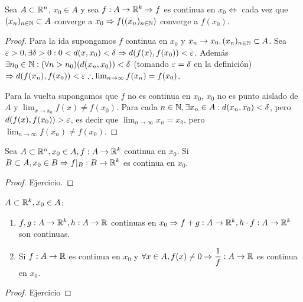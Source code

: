 \begin{prop}
  Sea \(A \subset \mathbb{R}^n\), \(x_0 \in A\) y sea \(f: A \to \mathbb{R}^k \Rightarrow f\) es continua en \(x_0 \iff\) cada vez que \((x_n)_{n \in \mathbb{N}} \subset A\) converge a \(x_0 \Rightarrow f((x_n)_{n \in \mathbb{N}})\) converge a \(f(x_0)\).
  \begin{proof}
    Para la ida supongamos \(f\) continua en \(x_0\) y \(x_n \to x_0, (x_n)_{n \in \mathbb{N}} \subset A\). Sea \(\varepsilon > 0, \exists \delta > 0 : 0 < d(x, x_0) < \delta \Rightarrow d(f(x), f(x_0)) < \varepsilon\).
    Además \(\exists n_0 \in \mathbb{N} : (\forall n > n_0)(d(x_n, x_0)) < \delta\) (tomando \(\varepsilon = \delta\) en la definición) \(\Rightarrow d(f(x_n), f(x_0)) < \varepsilon \therefore \lim_{n \to \infty} f(x_n) = f(x_0)\).

    Para la vuelta supongamos que \(f\) no es continua en \(x_0\), \(x_0\) no es punto aislado de \(A\) y \(\lim_{x \to x_0} f(x) \neq f(x_0)\). Para cada \(n \in \mathbb{N}, \exists x_n \in A : d(x_n, x_0) < \delta\), pero \(d(f(x), f(x_0)) > \varepsilon\), es decir que \(\lim_{n \to \infty} x_n = x_0\), pero \(\lim_{n \to \infty} f(x_n) \neq f(x_0)\).
  \end{proof}
\end{prop}

\begin{prop}
  Sea \(A \subset \mathbb{R}^n, x_0 \in A, f: A \to \mathbb{R}^k\) continua en \(x_0\). Si \(B \subset A, x_0 \in B \Rightarrow f|_B: B \to \mathbb{R}^k\) es continua en \(x_0\).
  \begin{proof}
    Ejercicio.
  \end{proof}
\end{prop}

\begin{prop}
  \(A \subset \mathbb{R}^k, x_0 \in A\):
  \begin{enumerate}
    \item \(f, g: A \to \mathbb{R}^k, h: A \to \mathbb{R}\) continuas en \(x_0 \Rightarrow f+g: A \to \mathbb{R}^k, h \cdot f: A \to \mathbb{R}^k\) son continuas.
    \item Si \(f: A \to \mathbb{R}\) es continua en \(x_0\) y \(\forall x \in A, f(x) \neq 0 \Rightarrow \dfrac{1}{f}: A \to \mathbb{R}\) es continua en \(x_0\).
  \end{enumerate}

  \begin{proof}
    Ejercicio
  \end{proof}
\end{prop}

